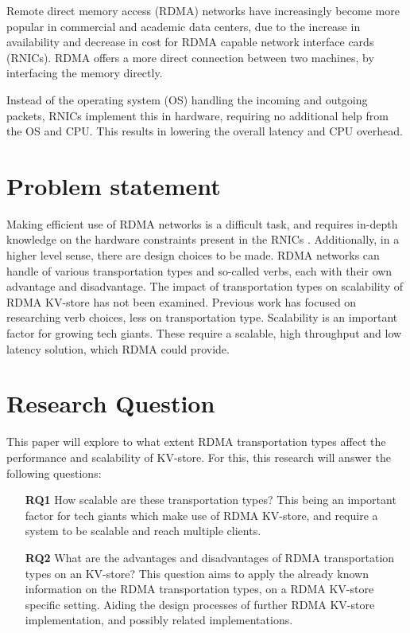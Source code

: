 Remote direct memory access (RDMA) networks have increasingly become more popular in commercial and academic data centers, due to the increase in availability and decrease in cost for RDMA capable network interface cards (RNICs).
RDMA offers a more direct connection between two machines, by interfacing the memory directly.

Instead of the operating system (OS) handling the incoming and outgoing packets, RNICs implement this in hardware, requiring no additional help from the OS and CPU. This results in lowering the overall latency and CPU overhead.

\section{Problem statement}
Making efficient use of RDMA networks is a difficult task, and requires in-depth knowledge on the hardware constraints present in the RNICs \cite{chen2019scalable}.
Additionally, in a higher level sense, there are design choices to be made.
RDMA networks can handle of various transportation types and so-called verbs, each with their own advantage and disadvantage.
The impact of transportation types on scalability of RDMA KV-store has not been examined.
Previous work has focused on researching verb choices, less on transportation type.
Scalability is an important factor for growing tech giants.
These require a scalable, high throughput and low latency solution, which RDMA could provide.

\section{Research Question}
This paper will explore to what extent RDMA transportation types affect the performance and scalability of KV-store.
For this, this research will answer the following questions:

\begin{itemize}
    \item[\textbf{RQ1}] How scalable are these transportation types?%
    This being an important factor for tech giants which make use of RDMA KV-store, and require a system to be scalable and reach multiple clients.
    \item[\textbf{RQ2}] What are the advantages and disadvantages of RDMA transportation types on an KV-store?
    This question aims to apply the already known information on the RDMA transportation types, on a RDMA KV-store specific setting.
    Aiding the design processes of further RDMA KV-store implementation, and possibly related implementations.
\end{itemize}

